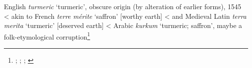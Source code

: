 \begin{etymology}\label{ety:turmeric}
English \textit{turmeric} `turmeric', obscure origin (by alteration of earlier forms), 1545
< akin to French \textit{terre mérite} `saffron' [worthy earth]
< and Medieval Latin \textit{terra merita} `turmeric' [deserved earth]
< Arabic \textit{kurkum} `turmeric; saffron', maybe a folk-etymological corruption\footnote{\textcite[turmeric]{oed}; \textcite[turmeric]{oe}; \textcite{guthrie_trade-language_2009}; \textcite[789]{klein_comprehensive_1971}}
\end{etymology}